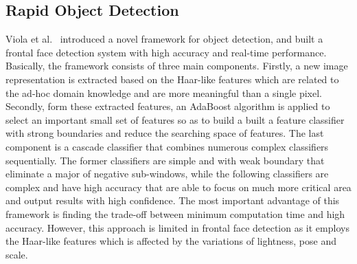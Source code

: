 \documentclass[12pt, a4paper, twoside]{article}
\begin{document}
\subsection{Rapid Object Detection}
Viola et al.~\cite{viola2001rapid} introduced a novel framework for object detection, and built a frontal face detection system with high accuracy and real-time performance. Basically, the framework consists of three main components. Firstly, a new image representation is extracted based on the Haar-like features which are related to the ad-hoc domain knowledge and are more meaningful than a single pixel. Secondly, form these extracted features, an AdaBoost algorithm is applied to select an important small set of features so as to build a built a feature classifier with strong boundaries and reduce the searching space of features. The last component is a cascade classifier that combines numerous complex classifiers sequentially. The former classifiers are simple and with weak boundary that eliminate a major of negative sub-windows, while the following classifiers are complex and have high accuracy that are able to focus on much more critical area and output results with high confidence. The most important advantage of this framework is finding the trade-off between minimum computation time and high accuracy. However, this approach is limited in frontal face detection as it employs the Haar-like features which is affected by the variations of lightness, pose and scale.



\end{document}

